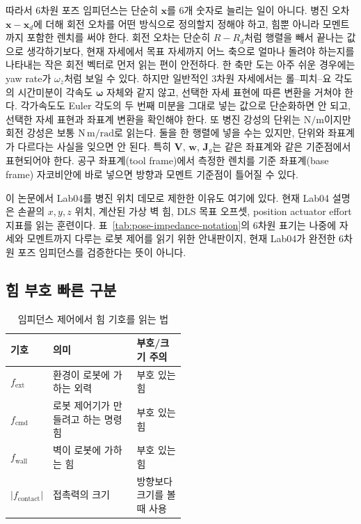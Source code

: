 따라서 6차원 포즈 임피던스는 단순히 $\bm{x}$를 6개 숫자로 늘리는 일이 아니다.
병진 오차 $\bm{x}-\bm{x}_d$에 더해 회전 오차를 어떤 방식으로 정의할지 정해야 하고, 힘뿐 아니라 모멘트까지 포함한 렌치를 써야 한다.
회전 오차는 단순히 $R-R_d$처럼 행렬을 빼서 끝나는 값으로 생각하기보다, 현재 자세에서 목표 자세까지 어느 축으로 얼마나 돌려야 하는지를 나타내는 작은 회전 벡터로 먼저 읽는 편이 안전하다.
한 축만 도는 아주 쉬운 경우에는 yaw rate가 \(\omega_z\)처럼 보일 수 있다.
하지만 일반적인 3차원 자세에서는 롤--피치--요 각도의 시간미분이 각속도 \(\bm{\omega}\) 자체와 같지 않고, 선택한 자세 표현에 따른 변환을 거쳐야 한다.
각가속도도 Euler 각도의 두 번째 미분을 그대로 넣는 값으로 단순화하면 안 되고, 선택한 자세 표현과 좌표계 변환을 확인해야 한다.
또 병진 강성의 단위는 $\mathrm{N/m}$이지만 회전 강성은 보통 $\mathrm{N\,m/rad}$로 읽는다.
둘을 한 행렬에 넣을 수는 있지만, 단위와 좌표계가 다르다는 사실을 잊으면 안 된다.
특히 $\bm{V}$, $\bm{w}$, $\bm{J}_g$는 같은 좌표계와 같은 기준점에서 표현되어야 한다.
공구 좌표계(tool frame)에서 측정한 렌치를 기준 좌표계(base frame) 자코비안에 바로 넣으면 방향과 모멘트 기준점이 틀어질 수 있다.

이 논문에서 Lab04를 병진 위치 데모로 제한한 이유도 여기에 있다.
현재 Lab04 설명은 손끝의 $x,y,z$ 위치, 계산된 가상 벽 힘, DLS 목표 오프셋, position actuator effort 지표를 읽는 훈련이다.
표~\ref{tab:pose-impedance-notation}의 6차원 표기는 나중에 자세와 모멘트까지 다루는 로봇 제어를 읽기 위한 안내판이지, 현재 Lab04가 완전한 6차원 포즈 임피던스를 검증한다는 뜻이 아니다.

\subsection{힘 부호 빠른 구분}

\begin{table}[H]
  \centering
  \caption{임피던스 제어에서 힘 기호를 읽는 법}
  \small
  \setlength{\tabcolsep}{4pt}
  \begin{tabularx}{\linewidth}{@{}>{\raggedright\arraybackslash}p{0.22\linewidth}>{\raggedright\arraybackslash}X>{\raggedright\arraybackslash}p{0.28\linewidth}@{}}
    \toprule
    기호 & 의미 & 부호/크기 주의 \\
    \midrule
    $f_{\mathrm{ext}}$ & 환경이 로봇에 가하는 외력 & 부호 있는 힘 \\
    $f_{\mathrm{cmd}}$ & 로봇 제어기가 만들려고 하는 명령힘 & 부호 있는 힘 \\
    $f_{\mathrm{wall}}$ & 벽이 로봇에 가하는 힘 & 부호 있는 힘 \\
    $|f_{\mathrm{contact}}|$ & 접촉력의 크기 & 방향보다 크기를 볼 때 사용 \\
    \bottomrule
  \end{tabularx}
\end{table}


